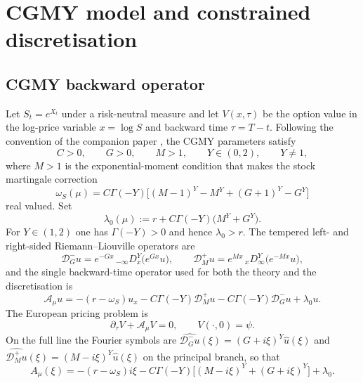 \documentclass[11pt]{amsart}
\theoremstyle{remark}
\newcommand{\rf}{r}
\newcommand{\Dm}{\mathcal D_G^-}
\newcommand{\Dp}{\mathcal D_M^+}
\newcommand{\Aop}{\mathcal A_\mu}
\begin{document}
\section{CGMY model and constrained discretisation}
\label{sec:model}\label{sec:galerkin}
\subsection{CGMY backward operator}
\label{ssec:operator}

Let $S_t=e^{X_t}$ under a risk-neutral measure and let $V(x,\tau)$ be the
option value in the log-price variable $x=\log S$ and backward time
$\tau=T-t$.  Following the convention of the companion paper
\cite{DamircheliCGMY2026}, the CGMY parameters satisfy
\begin{equation}
  C>0,\qquad G>0,\qquad M>1,\qquad Y\in(0,2),\qquad Y\ne1,
  \label{eq:cgmy-parameters}
\end{equation}
where $M>1$ is the exponential-moment condition that makes the stock
martingale correction
\begin{equation}
  \omega_S(\mu)
  = C\Gamma(-Y)\bigl[(M-1)^Y-M^Y+(G+1)^Y-G^Y\bigr]
  \label{eq:martingale-correction}
\end{equation}
real valued.  Set
\begin{equation}
  \lambda_0(\mu) := \rf + C\Gamma(-Y)\bigl(M^Y+G^Y\bigr).
  \label{eq:lambda0}
\end{equation}
For $Y\in(1,2)$ one has $\Gamma(-Y)>0$ and hence $\lambda_0>\rf$.  The
tempered left- and right-sided Riemann--Liouville operators are
\begin{equation}
  \Dm u=e^{-Gx}\,{}_{-\infty}D_x^Y\bigl(e^{Gx}u\bigr),
  \qquad
  \Dp u=e^{Mx}\,{}_{x}D_\infty^Y\bigl(e^{-Mx}u\bigr),
  \label{eq:tempered-ops}
\end{equation}
and the single backward-time operator used for both the theory and the
discretisation is
\begin{equation}
  \Aop u
  =-(\rf-\omega_S)u_x
   -C\Gamma(-Y)\Dp u
   -C\Gamma(-Y)\Dm u
   +\lambda_0u.
  \label{eq:cgmy-operator}
\end{equation}
The European pricing problem is
\begin{equation}
  \partial_\tau V+\Aop V=0,
  \qquad
  V(\cdot,0)=\psi.
  \label{eq:pricing-pide}
\end{equation}
On the full line the Fourier symbols are
$\widehat{\Dm u}(\xi)=(G+i\xi)^Y\widehat u(\xi)$ and
$\widehat{\Dp u}(\xi)=(M-i\xi)^Y\widehat u(\xi)$ on the principal branch, so
that
\begin{equation}
  A_\mu(\xi)
  =-(\rf-\omega_S)i\xi
   -C\Gamma(-Y)\bigl[(M-i\xi)^Y+(G+i\xi)^Y\bigr]
   +\lambda_0 .
  \label{eq:symbol}
\end{equation}
\end{document}
